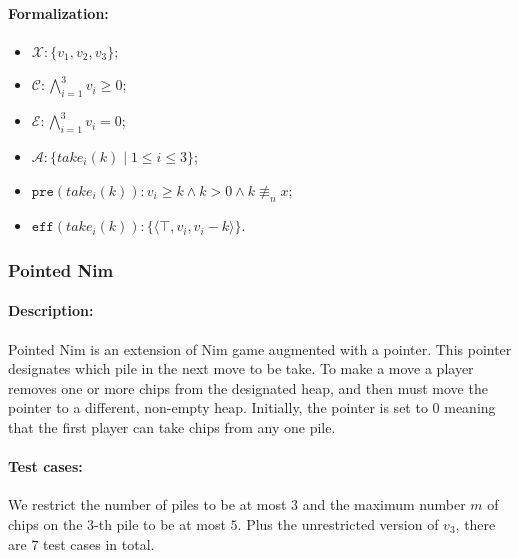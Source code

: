 \documentclass[review]{elsarticle}
\newcommand{\set}[1]{\{ #1 \}}
\newcommand{\tuple}[1]{\langle {#1} \rangle}
\newcommand{\true}{\top}
\newcommand{\statevar}{\mathcal{X}}
\newcommand{\act}{\mathcal{A}}
\newcommand{\constraint}{\mathcal{C}}
\newcommand{\estate}{\mathcal{E}}
\newcommand{\pre}{\mathtt{pre}}
\newcommand{\eff}{\mathtt{eff}}
\newcommand{\nmodulo}{\not \equiv}
\begin{document}
\paragraph{Formalization:}
\begin{itemize}
	\item $\statevar: \set{v_1, v_2, v_3}$;
	\item $\constraint: \bigwedge_{i=1}^{3} v_i \ge 0$;
	\item $\estate: \bigwedge_{i=1}^{3} v_i = 0$;
	\item $\act:\set{take_i(k){\mid}1 \le i\le 3}$;
	\item $\pre(take_i(k)) : v_i \ge k \wedge k > 0 \wedge k \nmodulo_n x$;
	\item $\eff(take_i(k)) : \set{\tuple{\true,v_i,v_i -k}}$.
\end{itemize}

\subsubsection{Pointed Nim \protect\cite{AlbN2004}}

\paragraph{Description:}
Pointed Nim is an extension of Nim game augmented with a pointer. %
This pointer designates which pile in the next move to be take. 
To make a move a player removes one or more chips from the designated heap, and then must move the pointer to a different, non-empty heap. 
Initially, the pointer is set to $0$ meaning that the first player can take chips from any one pile.
\paragraph{Test cases:}
We restrict the number of piles to be at most $3$ and the maximum number $m$ of chips on the $3$-th pile to be at most $5$. 
Plus the unrestricted version of $v_3$, there are $7$ test cases in total.
\end{document}
